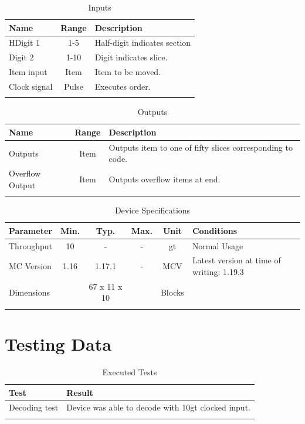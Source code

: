 \documentclass[10pt]{datasheet}
\begin{document}
\begin{table}[h]
    \caption{Inputs}
    \begin{tabularx}{\textwidth}{l | c | X}
        \thickhline
        \textbf{Name} & \textbf{Range} & \textbf{Description} \\
        \hline
        HDigit 1 & 1-5 & Half-digit indicates section \\
        \hline
        Digit 2 & 1-10 & Digit indicates slice. \\
        \hline
        Item input & Item & Item to be moved. \\
        \hline
        Clock signal & Pulse & Executes order. \\
        \thickhline
\end{tabularx}
\end{table}

\begin{table}[h]
    \caption{Outputs}
    \begin{tabularx}{\textwidth}{l | c | X}
        \thickhline
        \textbf{Name} & \textbf{Range} & \textbf{Description} \\
        \hline
        Outputs & Item & Outputs item to one of fifty slices corresponding to code. \\
        \hline
        Overflow Output & Item & Outputs overflow items at end. \\
        \thickhline
\end{tabularx}
\end{table}

\begin{table}[h]
    \caption{Device Specifications}
    \begin{tabularx}{\textwidth}{l | c c c | c | X}
        \thickhline
        \textbf{Parameter} & \textbf{Min.} & \textbf{Typ.} & \textbf{Max.} &
        \textbf{Unit} & \textbf{Conditions} \\
        \hline
        Throughput  & 10 & - & - & gt & Normal Usage \\
        \hline
        MC Version & 1.16 & 1.17.1 & - & MCV & Latest version at time of writing: 1.19.3\\
        \hline
        Dimensions & & 67 x 11 x 10 & & Blocks & \\
        \thickhline
\end{tabularx}
\end{table}
\newpage
\section{Testing Data}
\begin{table}[h]
\caption{Executed Tests}
\begin{tabularx}{\textwidth}{l | X}
    \thickhline
    \textbf{Test} & \textbf{Result} \\
    \hline
    Decoding test & Device was able to decode with 10gt clocked input. \\
    \thickhline
\end{tabularx}
\end{table}
\end{document}
